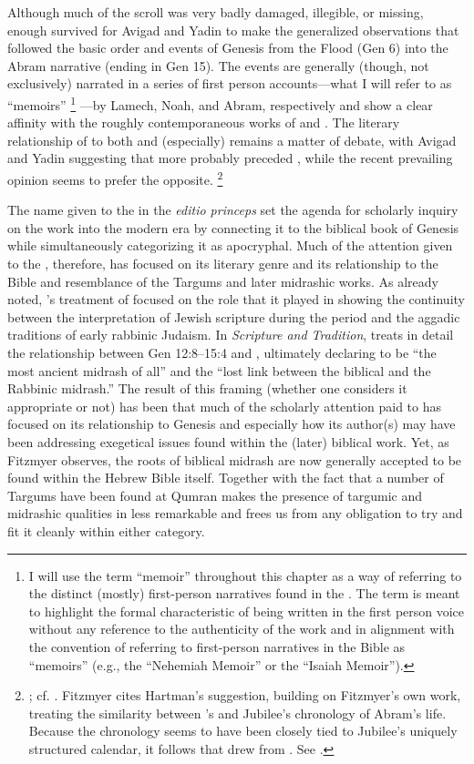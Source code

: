 Although much of the scroll was very badly damaged, illegible, or missing, enough survived for Avigad and Yadin to make the generalized observations that \ga followed the basic order and events of Genesis from the Flood (Gen 6) into the Abram narrative (ending in Gen 15). The events are generally (though, not exclusively) narrated in a series of first person accounts---what I will refer to as ``memoirs''%
%
\footnote{I will use the term ``memoir'' throughout this chapter as a way of referring to the distinct (mostly) first-person narratives found in the \ga. The term is meant to highlight the formal characteristic of being written in the first person voice without any reference to the authenticity of the work and in alignment with the convention of referring to first-person narratives in the Bible as ``memoirs'' (e.g., the ``Nehemiah Memoir'' or the ``Isaiah Memoir'').}%
---by Lamech, Noah, and Abram, respectively and show a clear affinity with the roughly contemporaneous works of \firstenoch and \jub.\autocite[16--37]{avigad-yadin1956} The literary relationship of \ga to both \firstenoch and (especially) \jub remains a matter of debate, with Avigad and Yadin suggesting that \ga more probably preceded \jub, while the recent prevailing opinion seems to prefer the opposite.%
%
\footnote{\cite[38]{avigad-yadin1956}; cf. \cite[20--21]{fitzmyer2004}. Fitzmyer cites Hartman's suggestion, building on Fitzmyer's own work, treating the similarity between \ga's and Jubilee's chronology of Abram's life. Because the chronology seems to have been closely tied to Jubilee's uniquely structured calendar, it follows that \ga drew from \jub. See \cite[497]{hartman_cbq1966}.}

The name given to the \ga in the \emph{editio princeps} set the agenda for scholarly inquiry on the work into the modern era by connecting it to the biblical book of Genesis while simultaneously categorizing it as apocryphal. Much of the attention given to the \ga, therefore, has focused on its literary genre and its relationship to the Bible and resemblance of the Targums and later midrashic works. As already noted, \vermes's treatment of \ga focused on the role that it played in showing the continuity between the interpretation of Jewish scripture during the \secondtemple period and the aggadic traditions of early rabbinic Judaism. In \emph{Scripture and Tradition}, \vermes treats in detail the relationship between Gen 12:8--15:4 and \ga {}, ultimately declaring \ga to be ``the most ancient midrash of all'' and the ``lost link between the biblical and the Rabbinic midrash.''\autocite[124]{vermes1961} The result of this framing (whether one considers it appropriate or not) has been that much of the scholarly attention paid to \ga has focused on its relationship to Genesis and especially how its author(s) may have been addressing exegetical issues found within the (later) biblical work. Yet, as Fitzmyer observes, the roots of biblical midrash are now generally accepted to be found within the Hebrew Bible itself.\autocite[20]{fitzmyer2004} Together with the fact that a number of Targums have been found at Qumran makes the presence of targumic and midrashic qualities in \ga less remarkable and frees us from any obligation to try and fit it cleanly within either category.

